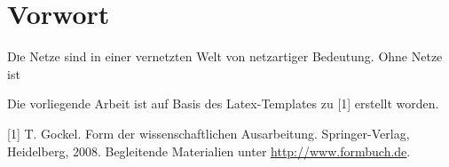 \chapter*{Vorwort}
\label{chapter_vorwort}
\thispagestyle{empty}

\renewcommand{\LettrineFontHook}{\fontfamily{ppl}\fontseries{bx}}
\lettrine[lines=2]{D}ie Netze sind in einer vernetzten Welt von netzartiger
Bedeutung. Ohne Netze ist 


\vfill

Die vorliegende Arbeit ist auf Basis des Latex-Templates zu [1] erstellt worden.

\vspace{\baselineskip}

[1] T. \mbox{Gockel}. Form der wissenschaftlichen Ausarbeitung. Springer-Verlag, Heidelberg, 2008.
 Begleitende Materialien unter \url{http://www.formbuch.de}.


%